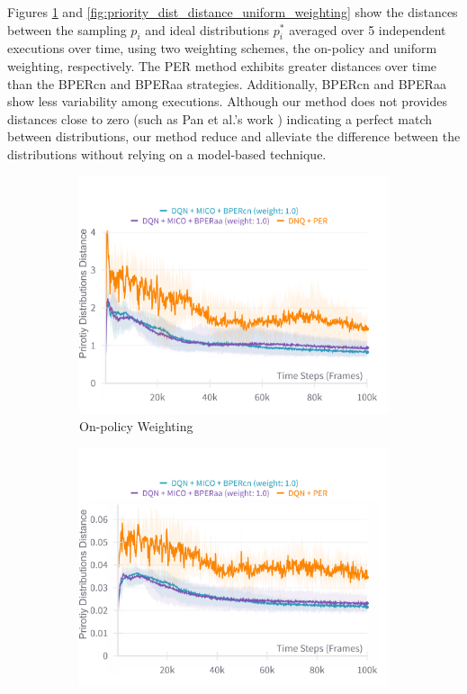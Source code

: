 Figures \ref{fig:priority_dist_distance_on_policy_weighting} and \ref{fig:priority_dist_distance_uniform_weighting} show the distances between the sampling $p_i$ and ideal distributions $p^\ast_i$  averaged over 5 independent executions over time, using two weighting schemes, the on-policy and uniform weighting, respectively. The PER method exhibits greater distances over time than the BPERcn and BPERaa strategies. Additionally, BPERcn and BPERaa show less variability among executions. Although our method does not provides distances close to zero (such as Pan et al.'s work \cite{pan2022understanding}) indicating a perfect match between distributions, our method reduce and alleviate the difference between the distributions without relying on a model-based technique. 

\begin{figure}[!h]
    \centering
    \begin{subfigure}{0.45\textwidth}
    \includegraphics[width=\linewidth]{Results/grid_world/on_policy_weighting_outdated_priorities.png}
        \caption{On-policy Weighting}
        \label{fig:priority_dist_distance_on_policy_weighting}
    \end{subfigure}
    \hfill
    \begin{subfigure}{0.45\textwidth}
        \includegraphics[width=\linewidth]{Results/grid_world/uniform_weighting_outdated_priorities.png}

\end{subfigure}
\end{figure}
